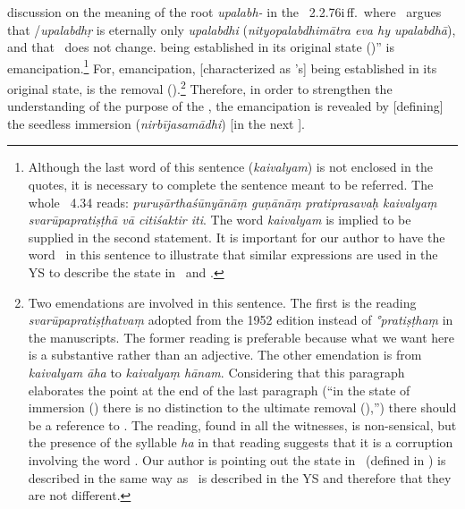 {discussion on the meaning of the root \emph{upalabh-} in the \Upad\ 2.2.76i\,ff.\ where \Sankara\ argues that \atman/\emph{upalabdhṛ} is eternally only \emph{upalabdhi} (\emph{nityopalabdhimātra eva hy upalabdhā}), and that \atman\ does not change.} being established in its original state ()'' is emancipation.\footnote{Although the last word of this sentence (\emph{kaivalyam}) is not enclosed in the quotes, it is necessary to complete the sentence meant to be referred. The whole \sutra\ 4.34 reads: \emph{puruṣārthaśūnyānāṃ guṇānāṃ pratiprasavaḥ kaivalyaṃ svarūpapratiṣṭhā vā citiśaktir iti}.  The word \emph{kaivalyam} is implied to be supplied in the second statement.  It is important for our author to have the word \kaivalya\ in this sentence to illustrate that similar expressions are used in the YS to describe the state in \asamprajnata\samadhi\ and \kaivalya.}
For, emancipation, [characterized as \citisakti's] being established in its original state, is the removal (\hana).\footnote{Two emendations are involved in this sentence.  The first is the reading \emph{sva\-rūpa\-prati\-ṣṭha\-tvaṃ} adopted from the 1952 edition instead of \emph{°prati\-ṣṭhaṃ} in the manuscripts.  The former reading is preferable because what we want here is a substantive rather than an adjective.  The other emendation is from \emph{kaivalyam āha} to \emph{kaivalyaṃ hānam}.  Considering that this paragraph elaborates the point at the end of the last paragraph (``in the state of immersion (\samadhi) there is no distinction to the ultimate removal (\hana),'') there should be a reference to \hana.  The reading, found in all the witnesses, is non-sensical, but the presence of the syllable \emph{ha} in that reading suggests that it is a corruption involving the word \hana.  Our author is pointing out the state in \asamprajnata\samadhi\ (defined in ) is described in the same way as \kaivalya\ is described in the YS and therefore that they are not different.}  Therefore, in order to strengthen the
understanding of the purpose of the \sastra, the emancipation is revealed by [defining] the seedless immersion (\emph{nirbījasamādhi}) [in the next \sutra].

